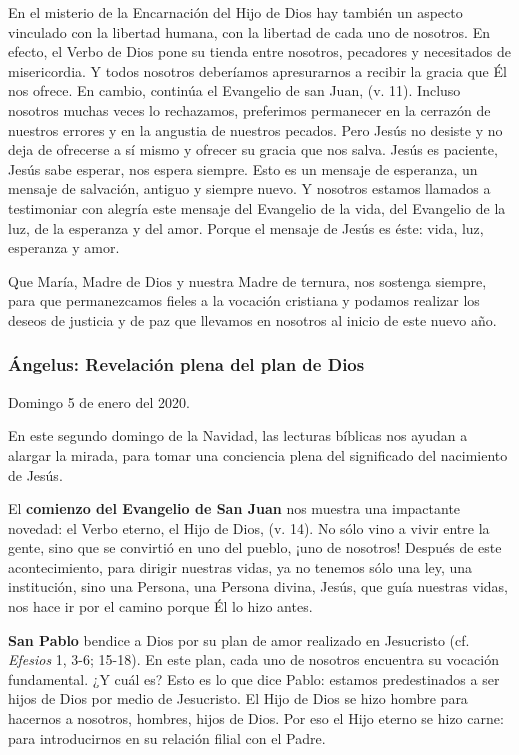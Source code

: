 En el misterio de la Encarnación del Hijo de Dios hay también un aspecto vinculado con la libertad humana, con la libertad de cada uno de nosotros. En efecto, el Verbo de Dios pone su tienda entre nosotros, pecadores y necesitados de misericordia. Y todos nosotros deberíamos apresurarnos a recibir la gracia que Él nos ofrece. En cambio, continúa el Evangelio de san Juan,  (v. 11). Incluso nosotros muchas veces lo rechazamos, preferimos permanecer en la cerrazón de nuestros errores y en la angustia de nuestros pecados. Pero Jesús no desiste y no deja de ofrecerse a sí mismo y ofrecer su gracia que nos salva. Jesús es paciente, Jesús sabe esperar, nos espera siempre. Esto es un mensaje de esperanza, un mensaje de salvación, antiguo y siempre nuevo. Y nosotros estamos llamados a testimoniar con alegría este mensaje del Evangelio de la vida, del Evangelio de la luz, de la esperanza y del amor. Porque el mensaje de Jesús es éste: vida, luz, esperanza y amor.

Que María, Madre de Dios y nuestra Madre de ternura, nos sostenga siempre, para que permanezcamos fieles a la vocación cristiana y podamos realizar los deseos de justicia y de paz que llevamos en nosotros al inicio de este nuevo año.

\subsubsection{Ángelus: Revelación plena del plan de Dios}

Domingo 5 de enero del 2020.

En este segundo domingo de la Navidad, las lecturas bíblicas nos ayudan a alargar la mirada, para tomar una conciencia plena del significado del nacimiento de Jesús.

El \textbf{comienzo del Evangelio de San Juan} nos muestra una impactante novedad: el Verbo eterno, el Hijo de Dios,  (v. 14). No sólo vino a vivir entre la gente, sino que se convirtió en uno del pueblo, ¡uno de nosotros! Después de este acontecimiento, para dirigir nuestras vidas, ya no tenemos sólo una ley, una institución, sino una Persona, una Persona divina, Jesús, que guía nuestras vidas, nos hace ir por el camino porque Él lo hizo antes.

\textbf{San Pablo} bendice a Dios por su plan de amor realizado en Jesucristo (cf. \emph{Efesios} 1, 3-6; 15-18). En este plan, cada uno de nosotros encuentra su vocación fundamental. ¿Y cuál es? Esto es lo que dice Pablo: estamos predestinados a ser hijos de Dios por medio de Jesucristo. El Hijo de Dios se hizo hombre para hacernos a nosotros, hombres, hijos de Dios. Por eso el Hijo eterno se hizo carne: para introducirnos en su relación filial con el Padre.


